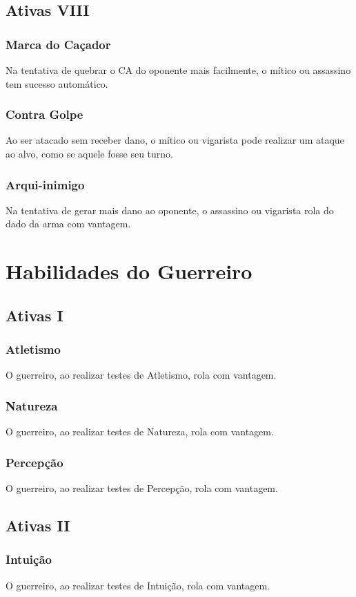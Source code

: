 \documentclass[10pt,twoside,twocolumn]{book}
\begin{document}
\subsection*{Ativas VIII}
\subsubsection*{Marca do Caçador}
Na tentativa de quebrar o CA do oponente mais facilmente, o mítico ou assassino tem sucesso automático.
\subsubsection*{Contra Golpe}
Ao ser atacado sem receber dano, o mítico ou vigarista pode realizar um ataque ao alvo, como se aquele fosse seu turno.
\subsubsection*{Arqui-inimigo}
Na tentativa de gerar mais dano ao oponente, o assassino ou vigarista rola do dado da arma com vantagem.

\section{Habilidades do Guerreiro}
\subsection*{Ativas I}
\subsubsection*{Atletismo}
O guerreiro, ao realizar testes de Atletismo, rola com vantagem.
\subsubsection*{Natureza}
O guerreiro, ao realizar testes de Natureza, rola com vantagem.
\subsubsection*{Percepção}
O guerreiro, ao realizar testes de Percepção, rola com vantagem.

\subsection*{Ativas II}
\subsubsection*{Intuição}
O guerreiro, ao realizar testes de Intuição, rola com vantagem.
\end{document}
